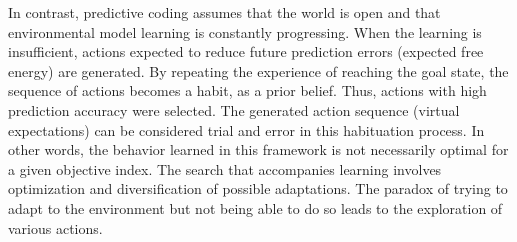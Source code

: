 In contrast, predictive coding assumes that the world is open and that environmental model learning is constantly progressing. When the learning is insufficient, actions expected to reduce future prediction errors (expected free energy) are generated. By repeating the experience of reaching the goal state, the sequence of actions becomes a habit, as a prior belief. Thus, actions with high prediction accuracy were selected. The generated action sequence (virtual expectations) can be considered trial and error in this habituation process. In other words, the behavior learned in this framework is not necessarily optimal for a given objective index. The search that accompanies learning involves optimization and diversification of possible adaptations. The paradox of trying to adapt to the environment but not being able to do so leads to the exploration of various actions.


